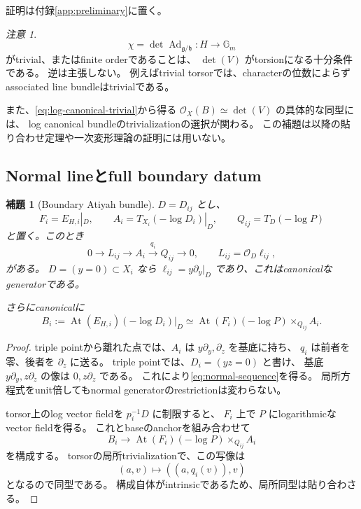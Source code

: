 \documentclass[uplatex,dvipdfmx,11pt]{jsarticle}
\numberwithin{equation}{section}
\theoremstyle{plain}
\newtheorem{lemma}[theorem]{補題}
\theoremstyle{definition}
\theoremstyle{remark}
\newtheorem{remark}[theorem]{注意}
\DeclareMathOperator{\At}{At}
\DeclareMathOperator{\Ad}{Ad}
\newcommand{\OO}{\mathcal O}
\newcommand{\GG}{\mathbb G}
\newcommand{\g}{\mathfrak g}
\newcommand{\h}{\mathfrak h}
\begin{document}
証明は付録\ref{app:preliminary}に置く。

\begin{remark}
\label{rem:character}
\[
\chi=\det\Ad_{\g/\h}:H\longrightarrow\GG_m
\]
がtrivial、またはfinite orderであることは、
\(\det(V)\) がtorsionになる十分条件である。
逆は主張しない。
例えばtrivial torsorでは、characterの位数によらずassociated line bundleはtrivialである。

また、\eqref{eq:log-canonical-trivial}から得る
\(\OO_X(B)\simeq\det(V)\) の具体的な同型には、
log canonical bundleのtrivializationの選択が関わる。
この補題は以降の貼り合わせ定理や一次変形理論の証明には用いない。
\end{remark}

\subsection{Normal lineとfull boundary datum}

\begin{lemma}[Boundary Atiyah bundle]
\label{lem:boundary-atiyah}
\(D=D_{ij}\) とし、
\[
F_i=E_{H,i}|_D,\qquad
A_i=T_{X_i}(-\log D_i)|_D,\qquad
Q_{ij}=T_D(-\log P)
\]
と置く。このとき
\begin{equation}
\label{eq:normal-sequence}
0\longrightarrow L_{ij}
\longrightarrow A_i\xrightarrow{q_i}Q_{ij}
\longrightarrow0,
\qquad
L_{ij}=\OO_D\ell_{ij},
\end{equation}
がある。
\(D=(y=0)\subset X_i\) なら
\(\ell_{ij}=y\partial_y|_D\) であり、これはcanonicalなgeneratorである。

さらにcanonicalに
\begin{equation}
\label{eq:boundary-fiber-product}
B_i:=
\At(E_{H,i})(-\log D_i)|_D
\simeq
\At(F_i)(-\log P)\times_{Q_{ij}}A_i.
\end{equation}
\end{lemma}

\begin{proof}
triple pointから離れた点では、\(A_i\) は
\(y\partial_y,\partial_z\) を基底に持ち、
\(q_i\) は前者を零、後者を \(\partial_z\) に送る。
triple pointでは、\(D_i=(yz=0)\) と書け、
基底 \(y\partial_y,z\partial_z\) の像は
\(0,z\partial_z\) である。
これにより\eqref{eq:normal-sequence}を得る。
局所方程式をunit倍してもnormal generatorのrestrictionは変わらない。

torsor上のlog vector fieldを \(p_i^{-1}D\) に制限すると、
\(F_i\) 上で \(P\) にlogarithmicなvector fieldを得る。
これとbaseのanchorを組み合わせて
\[
B_i\longrightarrow
\At(F_i)(-\log P)\times_{Q_{ij}}A_i
\]
を構成する。
torsorの局所trivializationで、この写像は
\[
(a,v)\longmapsto((a,q_i(v)),v)
\]
となるので同型である。
構成自体がintrinsicであるため、局所同型は貼り合わさる。
\end{proof}
\end{document}
